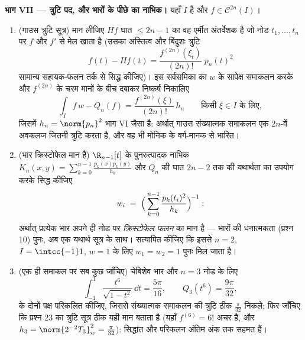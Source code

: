 \begin{problem}
\medskip
\noindent\textbf{भाग VII --- त्रुटि पद, और भारों के पीछे का
नाभिक।} यहाँ $I$  है और $f \in \mathcal
C^{2n}(I)$।
\begin{enumerate}[resume]
  \item (गाउस त्रुटि सूत्र) मान लीजिए $Hf$ घात $\leq 2n - 1$ का वह
        एर्मीत अंतर्वेशक है जो नोड $t_1, \dots, t_n$ पर $f$ और $f'$ से मेल
        खाता है (उसका अस्तित्व और बिंदुशः त्रुटि
        \[
        f(t) - Hf(t) =
        \frac{f^{(2n)}(\xi_t)}{(2n)!}\;p_n(t)^2
        \]
        सामान्य सहायक-फलन तर्क से सिद्ध कीजिए)। इस सर्वसमिका का
        $w$ के सापेक्ष समाकलन करके और $f^{(2n)}$ के चरम मानों के
        बीच दबाकर निष्कर्ष निकालिए
        \[
        \int_I f\,w - Q_n(f)
        = \frac{f^{(2n)}(\xi)}{(2n)!}\,h_n
        \qquad\text{किसी } \xi \in I \text{ के लिए},
        \]
        जिसमें $h_n = \norm{p_n}^2$ भाग VI जैसा है: अर्थात् गाउस संख्यात्मक
        समाकलन एक $2n$-वें अवकलज जितनी त्रुटि करता है, और वह भी
        मोनिक  के वर्ग-मानक से भारित।
  \item (भार क्रिस्टोफेल मान हैं) $\R_{n-1}[t]$ के पुनरुत्पादक नाभिक
        $K_n(x, y) = \sum_{k=0}^{n-1}
        \frac{p_k(x)p_k(y)}{h_k}$ और $Q_n$ की घात $2n - 2$ तक की यथार्थता का उपयोग करके
        सिद्ध कीजिए
        \[
        w_i \;=\;
        \Bigl(\,\sum_{k=0}^{n-1}
        \frac{p_k(t_i)^2}{h_k}\Bigr)^{\!-1} :
        \]
        अर्थात् प्रत्येक भार अपने ही नोड पर \emph{क्रिस्टोफेल
        फलन} का मान है --- भारों की धनात्मकता (प्रश्न 10) पुनः,
        अब एक यथार्थ सूत्र के साथ। सत्यापित कीजिए कि इससे $n =
        2$,
        $I = \intcc{-1}1$, $w = 1$ के लिए $w_1 = w_2 = 1$ पुनः मिल जाता है।
  \item (एक ही समाकल पर सब कुछ जाँचिए) चेबिशेव भार और $n = 3$ नोड
        के लिए
        \[
        \int_{-1}^{1}\frac{t^6}{\sqrt{1 - t^2}}\,\dd t
        = \frac{5\pi}{16},
        \qquad
        Q_3(t^6) = \frac{9\pi}{32},
        \]
        के दोनों पक्ष परिकलित कीजिए, जिससे संख्यात्मक समाकलन की
        त्रुटि ठीक $\frac{\pi}{32}$ निकले; फिर जाँचिए कि प्रश्न 23 का त्रुटि
        सूत्र ठीक यही मान बताता है (यहाँ $f^{(6)} = 6!$ अचर है, और $h_3 = \norm{2^{-2}T_3}_w^2 =
        \frac\pi{32}$):
        सिद्धांत और परिकलन अंतिम अंक तक सहमत हैं।
\end{enumerate}
\end{problem}
